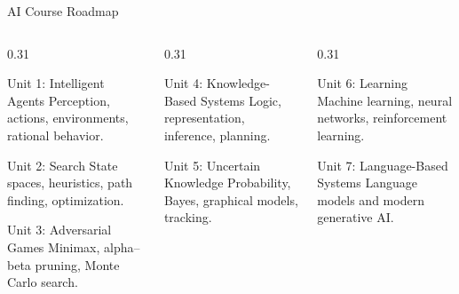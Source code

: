 \documentclass[aspectratio=169]{beamer}
\begin{document}
\begin{frame}[shrink=4]{AI Course Roadmap}
  \begin{columns}[T,onlytextwidth]
    \begin{column}{0.31\textwidth}
      \begin{block}{Unit 1: Intelligent Agents}
        Perception, actions, environments, rational behavior.
      \end{block}
      \begin{block}{Unit 2: Search}
        State spaces, heuristics, path finding, optimization.
      \end{block}
      \begin{block}{Unit 3: Adversarial Games}
        Minimax, alpha--beta pruning, Monte Carlo search.
      \end{block}
    \end{column}
    \begin{column}{0.31\textwidth}
      \begin{block}{Unit 4: Knowledge-Based Systems}
        Logic, representation, inference, planning.
      \end{block}
      \begin{block}{Unit 5: Uncertain Knowledge}
        Probability, Bayes, graphical models, tracking.
      \end{block}
    \end{column}
    \begin{column}{0.31\textwidth}
      \begin{block}{Unit 6: Learning}
        Machine learning, neural networks, reinforcement learning.
      \end{block}
      \begin{block}{Unit 7: Language-Based Systems}
        Language models and modern generative AI.
      \end{block}
    \end{column}
  \end{columns}
\end{frame}
\end{document}
